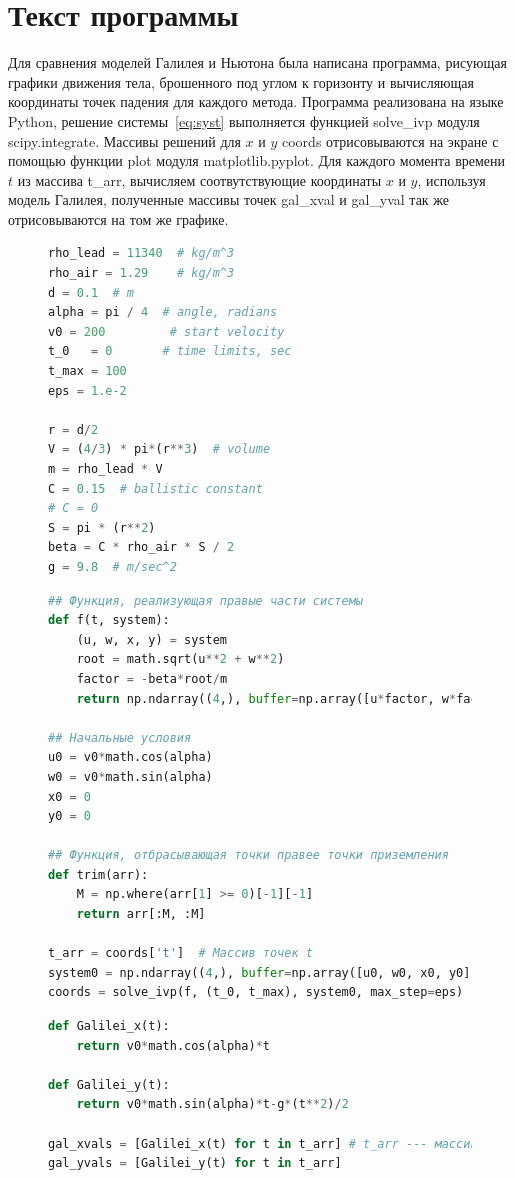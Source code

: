 \documentclass[14pt,russian]{extarticle}
\begin{document}
\section{Текст программы}
Для сравнения моделей Галилея и Ньютона была написана программа, рисующая графики движения тела, брошенного под углом к горизонту и вычисляющая координаты точек падения для каждого метода.
Программа реализована на языке Python, решение системы~\ref{eq:syst} выполняется функцией {\ttfamily solve\_ivp} модуля {\ttfamily scipy.integrate}. Массивы решений для $x$ и $y$ {\ttfamily coords} отрисовываются на экране с помощью функции {\ttfamily plot} модуля {\ttfamily matplotlib.pyplot}. Для каждого момента времени $t$ из массива {\ttfamily t\_arr}, вычисляем соотвутствующие координаты $x$ и $y$, используя модель Галилея, полученные массивы точек {\ttfamily gal\_xval} и {\ttfamily gal\_yval} так же отрисовываются на том же графике.
\begin{figure}[H]
\begin{lstlisting}[language=python, caption={Вычисление параметров системы~\ref{eq:syst}.},label={lst:init_params}]
rho_lead = 11340  # kg/m^3
rho_air = 1.29    # kg/m^3
d = 0.1  # m
alpha = pi / 4  # angle, radians
v0 = 200         # start velocity
t_0   = 0       # time limits, sec
t_max = 100
eps = 1.e-2

r = d/2
V = (4/3) * pi*(r**3)  # volume
m = rho_lead * V
C = 0.15  # ballistic constant
# C = 0
S = pi * (r**2)
beta = C * rho_air * S / 2
g = 9.8  # m/sec^2
\end{lstlisting}
\end{figure}
\begin{figure}[H]
\begin{lstlisting}[language=python, caption={Решение системы дифференциальных уравнений, описывающих движение тела в модели Ньютона.},label={lst:dif_eq_solution}]
## Функция, реализующая правые части системы
def f(t, system):
    (u, w, x, y) = system
    root = math.sqrt(u**2 + w**2)
    factor = -beta*root/m
    return np.ndarray((4,), buffer=np.array([u*factor, w*factor-g, u, w]))

## Начальные условия
u0 = v0*math.cos(alpha)
w0 = v0*math.sin(alpha)
x0 = 0
y0 = 0

## Функция, отбрасывающая точки правее точки приземления
def trim(arr):
    M = np.where(arr[1] >= 0)[-1][-1]
    return arr[:M, :M]
    
t_arr = coords['t']  # Массив точек t
system0 = np.ndarray((4,), buffer=np.array([u0, w0, x0, y0]))
coords = solve_ivp(f, (t_0, t_max), system0, max_step=eps)
\end{lstlisting}
\end{figure}
\begin{figure}[H]
\begin{lstlisting}[language=python, caption={Вычисление координат снаряда в каждый момент времени в модели Галилея.},label={lst:galilei_solution}]
def Galilei_x(t):
    return v0*math.cos(alpha)*t
    
def Galilei_y(t):
    return v0*math.sin(alpha)*t-g*(t**2)/2

gal_xvals = [Galilei_x(t) for t in t_arr] # t_arr --- массив точек t
gal_yvals = [Galilei_y(t) for t in t_arr]
\end{lstlisting}
\end{figure}
\end{document}
